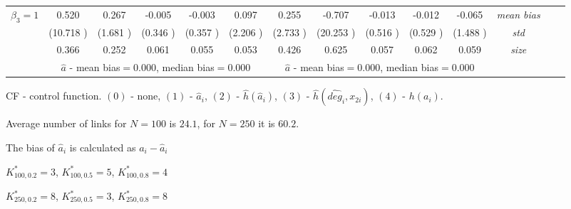 \begin{table}
\begin{threeparttable}
{\begin{tabular}{|c|c|c|c|c|c|c|c|c|c|c|c|c|c|}
\multirow{4}{*}{$\beta_3=1$}& 0.520 & 0.267 &-0.005& -0.003 &0.097 &0.255 &-0.707 &-0.013 &-0.012& -0.065 &\textit{mean bias} \\ 
&(10.718 )&(1.681 )&(0.346 )&(0.357 )&(2.206 )&(2.733 )&(20.253 )&(0.516 )&(0.529 )&(1.488 )&\textit{std}\\ 
& 0.366 & 0.252 &0.061 &0.055 &0.053 &0.426& 0.625& 0.057 &0.062 &0.059 &\textit{size} \\\midrule 
&\multicolumn{5}{|c|}{$\hat{a}$ - mean bias$=$0.000, median bias$=$0.000 }&\multicolumn{5}{|c|}{$\hat{a}$ - mean bias$=$0.000, median bias$=$0.000 }&\\ \hline 
\end{tabular}} 
\begin{tablenotes}\tiny 
\item CF - control function. $(0)$ - none, $(1)$ - $\hat{a}_i$,  $(2)$ - $\hat{h}(\hat{a}_i)$, $(3)$ - $\hat{h}(\widehat{deg}_i,x_{2i})$, $(4)$ - $h(a_i)$. 
\item Average number of links for $N=100$ is $24.1$, for $N=250$ it is $60.2$. 
\item The bias of $\hat{a}_i$ is calculated as $a_i-\hat{a}_i$ 
\item $K^*_{100,0.2}=3$, $K^*_{100,0.5}=5$, $K^*_{100,0.8}=4$ 
\item $K^*_{250,0.2}=8$, $K^*_{250,0.5}=3$, $K^*_{250,0.8}=8$ 
  \end{tablenotes} 
\end{threeparttable} 
\end{table} 

